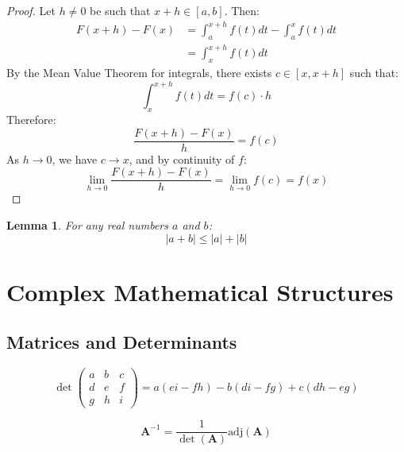 \documentclass[11pt]{article}
\newtheorem{lemma}{Lemma}
\begin{document}
\begin{proof}
Let $h \neq 0$ be such that $x + h \in [a,b]$. Then:
\begin{align}
F(x+h) - F(x) &= \int_a^{x+h} f(t) dt - \int_a^x f(t) dt \\
&= \int_x^{x+h} f(t) dt
\end{align}
By the Mean Value Theorem for integrals, there exists $c \in [x, x+h]$ such that:
\begin{equation}
\int_x^{x+h} f(t) dt = f(c) \cdot h
\end{equation}
Therefore:
\begin{equation}
\frac{F(x+h) - F(x)}{h} = f(c)
\end{equation}
As $h \to 0$, we have $c \to x$, and by continuity of $f$:
\begin{equation}
\lim_{h \to 0} \frac{F(x+h) - F(x)}{h} = \lim_{h \to 0} f(c) = f(x)
\end{equation}
\end{proof}

\begin{lemma}
For any real numbers $a$ and $b$:
\begin{equation}
|a + b| \leq |a| + |b|
\end{equation}
\end{lemma}

\section{Complex Mathematical Structures}

\subsection{Matrices and Determinants}
\begin{equation}
\det\begin{pmatrix}
a & b & c \\
d & e & f \\
g & h & i
\end{pmatrix} = a(ei - fh) - b(di - fg) + c(dh - eg)
\end{equation}

\begin{equation}
\mathbf{A}^{-1} = \frac{1}{\det(\mathbf{A})} \text{adj}(\mathbf{A})
\end{equation}
\end{document}
